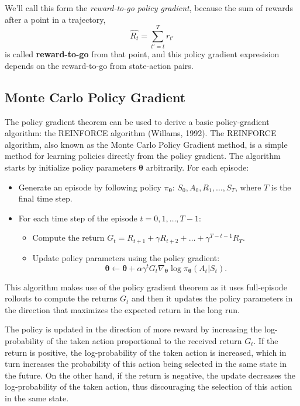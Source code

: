 We'll call this form the \textit{reward-to-go policy gradient}, because the sum of rewards after a point in a trajectory,
$$
\hat{R_t} = \sum_{t' = t}^{T} r_{t'}$$
is called \textbf{reward-to-go} from that point, and this policy gradient expresision depends on the reward-to-go from state-action pairs. 

\subsection{Monte Carlo Policy Gradient}


The policy gradient theorem can be used to derive a basic policy-gradient algorithm: the REINFORCE algorithm (Willams, 1992). The REINFORCE algorithm, also known as the Monte Carlo Policy Gradient method, is a simple method for learning policies directly from the policy gradient. 
The algorithm starts by initialize policy parameters $\boldsymbol{\theta}$ arbitrarily. For each episode:
    \begin{itemize}
        \item Generate an episode by following policy $\pi_{\boldsymbol{\theta}}$: $S_0, A_0, R_1, \ldots, S_T$, where $T$ is the final time step.
        \item For each time step of the episode $t = 0, 1, \ldots, T-1$:
            \begin{itemize}
                \item Compute the return $G_t = R_{t+1} + \gamma R_{t+2} + \ldots + \gamma^{T-t-1} R_T$.
                \item Update policy parameters using the policy gradient:
                \[
                    \boldsymbol{\theta} \leftarrow \boldsymbol{\theta} + \alpha \gamma^{t} G_t \nabla_{\boldsymbol{\theta}} \log \pi_{\boldsymbol{\theta}}(A_t|S_t).
                \]
            \end{itemize}
    \end{itemize}
This algorithm makes use of the policy gradient theorem as it uses full-episode rollouts to compute the returns $G_t$ and then it updates the policy parameters in the direction that maximizes the expected return in the long run.

The policy is updated in the direction of more reward by increasing the log-probability of the taken action proportional to the received return $G_t$. If the return is positive, the log-probability of the taken action is increased, which in turn increases the probability of this action being selected in the same state in the future. On the other hand, if the return is negative, the update decreases the log-probability of the taken action, thus discouraging the selection of this action in the same state.

